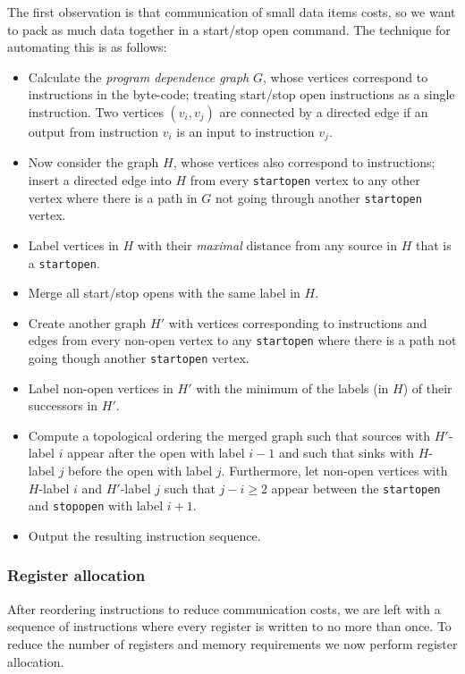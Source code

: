 \begin{mylisting}
The first observation is that communication of small data items
costs, so we want to pack as much data together in a start/stop open
command. 
The technique for automating this is as follows:
\begin{itemize}
  \item Calculate the \textit{program dependence graph} $G$, whose vertices correspond to
        instructions in the byte-code;
        treating start/stop open instructions as a single instruction.
        Two vertices $(v_i,v_j)$ are connected by a directed edge if an output from 
        instruction $v_i$ is an input to instruction $v_j$.
  \item Now consider the graph $H$, whose vertices also correspond to
    instructions; insert a directed edge into $H$ from every
    \verb+startopen+ vertex to any other vertex where there is a path
    in $G$ not going through another \verb+startopen+ vertex.
  \item Label vertices in $H$ with their {\em maximal} distance from
    any source in $H$ that is a \verb+startopen+.
  \item Merge all start/stop opens with the same label in $H$.
  \item Create another graph $H'$ with vertices corresponding to
    instructions and edges from every non-open vertex to any
    \verb+startopen+ where there is a path not going though another
    \verb+startopen+ vertex.
  \item Label non-open vertices in $H'$ with the minimum of the labels
    (in $H$) of their successors in $H'$.
  \item Compute a topological ordering the merged graph such that
    sources with $H'$-label $i$ appear after the open with label $i-1$
    and such that sinks with $H$-label $j$ before the open with label
    $j$. Furthermore, let non-open vertices with $H$-label $i$ and
    $H'$-label $j$ such that $j - i \ge 2$ appear between the
    \verb+startopen+ and \verb+stopopen+ with label $i+1$.
  \item Output the resulting instruction sequence.
\end{itemize}

\subsubsection{Register allocation}
\label{sec:regalloc}

After reordering instructions to reduce communication costs, we are left with
a sequence of instructions where every register is written to no more than
once. To reduce the number of registers and memory requirements we now
perform register allocation.


\end{mylisting}
